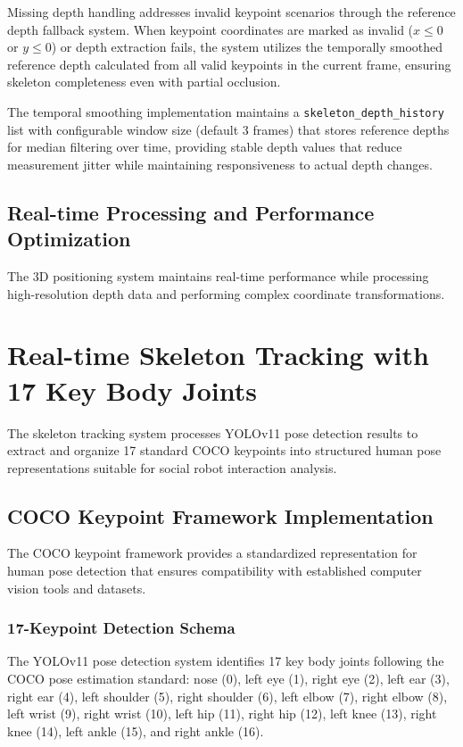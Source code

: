 Missing depth handling addresses invalid keypoint scenarios through the reference depth fallback system. When keypoint coordinates are marked as invalid ($x \leq 0$ or $y \leq 0$) or depth extraction fails, the system utilizes the temporally smoothed reference depth calculated from all valid keypoints in the current frame, ensuring skeleton completeness even with partial occlusion.

The temporal smoothing implementation maintains a \texttt{skeleton\_depth\_history} list with configurable window size (default 3 frames) that stores reference depths for median filtering over time, providing stable depth values that reduce measurement jitter while maintaining responsiveness to actual depth changes.

\subsection{Real-time Processing and Performance Optimization}

The 3D positioning system maintains real-time performance while processing high-resolution depth data and performing complex coordinate transformations.



\section{Real-time Skeleton Tracking with 17 Key Body Joints}

The skeleton tracking system processes YOLOv11 pose detection results to extract and organize 17 standard COCO keypoints into structured human pose representations suitable for social robot interaction analysis.

\subsection{COCO Keypoint Framework Implementation}

The COCO keypoint framework provides a standardized representation for human pose detection that ensures compatibility with established computer vision tools and datasets.

\subsubsection{17-Keypoint Detection Schema}

The YOLOv11 pose detection system identifies 17 key body joints following the COCO pose estimation standard: nose (0), left eye (1), right eye (2), left ear (3), right ear (4), left shoulder (5), right shoulder (6), left elbow (7), right elbow (8), left wrist (9), right wrist (10), left hip (11), right hip (12), left knee (13), right knee (14), left ankle (15), and right ankle (16).

